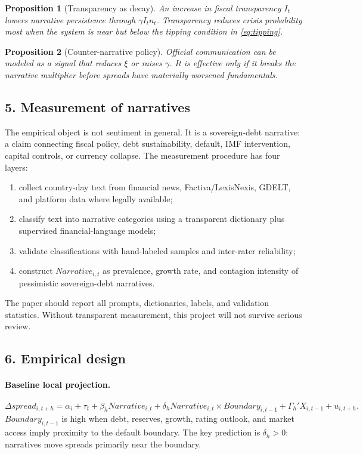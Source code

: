 \documentclass[11pt]{article}
\newtheorem{proposition}{Proposition}
\begin{document}
\begin{proposition}[Transparency as decay]
An increase in fiscal transparency $I_t$ lowers narrative persistence through $\gamma I_t n_t$. Transparency reduces crisis probability most when the system is near but below the tipping condition in \eqref{eq:tipping}.
\end{proposition}

\begin{proposition}[Counter-narrative policy]
Official communication can be modeled as a signal that reduces $\xi$ or raises $\gamma$. It is effective only if it breaks the narrative multiplier before spreads have materially worsened fundamentals.
\end{proposition}

\subsection*{5. Measurement of narratives}
The empirical object is not sentiment in general. It is a sovereign-debt narrative: a claim connecting fiscal policy, debt sustainability, default, IMF intervention, capital controls, or currency collapse. The measurement procedure has four layers:
\begin{enumerate}[label=(\roman*)]
\item collect country-day text from financial news, Factiva/LexisNexis, GDELT, and platform data where legally available;
\item classify text into narrative categories using a transparent dictionary plus supervised financial-language models;
\item validate classifications with hand-labeled samples and inter-rater reliability;
\item construct $Narrative_{i,t}$ as prevalence, growth rate, and contagion intensity of pessimistic sovereign-debt narratives.
\end{enumerate}
The paper should report all prompts, dictionaries, labels, and validation statistics. Without transparent measurement, this project will not survive serious review.

\subsection*{6. Empirical design}
\paragraph{Baseline local projection.}
\begin{equation}
\Delta spread_{i,t+h}=\alpha_i+\tau_t+\beta_h Narrative_{i,t}+\delta_h Narrative_{i,t}\times Boundary_{i,t-1}+\Gamma_h'X_{i,t-1}+u_{i,t+h}. \label{eq:narrative-lp}
\end{equation}
$Boundary_{i,t-1}$ is high when debt, reserves, growth, rating outlook, and market access imply proximity to the default boundary. The key prediction is $\delta_h>0$: narratives move spreads primarily near the boundary.
\end{document}
